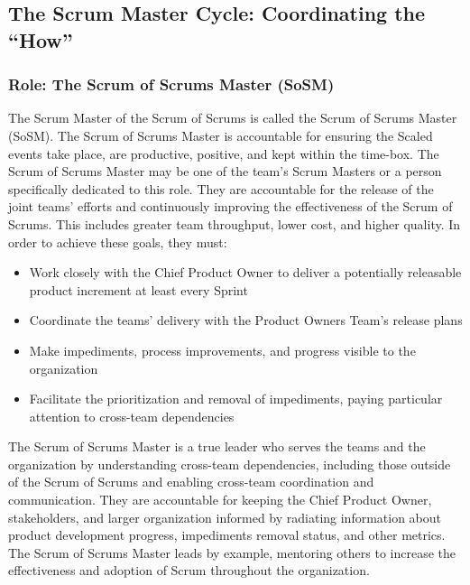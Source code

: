 \documentclass[12pt,a4paper,parskip=full]{scrartcl}
\begin{document}
\subsection{The Scrum Master Cycle: Coordinating the
``How''}\label{the-scrum-master-cycle}

\subsubsection{Role: The Scrum of Scrums Master
(SoSM)}\label{role-the-scrum-of-scrums-master}

The Scrum Master of the Scrum of Scrums is called the Scrum of Scrums Master (SoSM). The Scrum of Scrums Master is accountable for ensuring the Scaled events take place, are productive, positive, and kept within the time-box. The Scrum of Scrums Master may be one of the team's Scrum Masters or a person specifically dedicated to this role. They are accountable for the release of the joint teams' efforts and continuously improving the effectiveness of the Scrum of Scrums. This includes greater team throughput, lower cost, and higher quality. In order to achieve these goals, they must:

\begin{itemize}
\itemsep1pt\parskip0pt
\item
  Work closely with the Chief Product Owner to deliver a potentially
  releasable product increment at least every Sprint
\item
  Coordinate the teams' delivery with the Product Owners Team's release
  plans
\item
  Make impediments, process improvements, and progress visible to the
  organization
\item
  Facilitate the prioritization and removal of impediments, paying
  particular attention to cross-team dependencies
\end{itemize}

The Scrum of Scrums Master is a true leader who serves the teams and the organization by understanding cross-team dependencies, including those outside of the Scrum of Scrums and enabling cross-team coordination and communication. They are accountable for keeping the Chief Product Owner, stakeholders, and larger organization informed by radiating information about product development progress, impediments removal status, and other metrics. The Scrum of Scrums Master leads by example, mentoring others to increase the effectiveness and adoption of Scrum throughout the organization.
\end{document}
